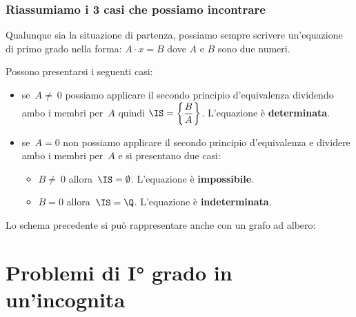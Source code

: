 \subsubsection{Riassumiamo i 3 casi che possiamo incontrare}

Qualunque sia la situazione di partenza, possiamo sempre scrivere un'equazione 
di primo grado nella forma: \quad 
\(A \cdot x = B\) \quad dove \(A\) e \(B\) sono due numeri.

Possono presentarsi i seguenti casi:
\begin{itemize} [nosep]
\item se~\(A\neq~0\) possiamo applicare il secondo principio
d'equivalenza dividendo ambo i membri per~\(A\) quindi
\(\IS =\left\{\dfrac{B}{A}\right\}\). L'equazione è \textbf{determinata}.
\item se~\(A=0\) non possiamo applicare il secondo principio
d'equivalenza e dividere ambo i membri per~\(A\) e si
presentano due casi:
\begin{itemize} [nosep]
\item \(B\neq~0\) allora~\(\IS =\emptyset \). 
L'equazione è \textbf{impossibile}.
\item \(B=0\) allora~\(\IS =\Q\). 
L'equazione è \textbf{indeterminata}.
\end{itemize}
\end{itemize}

Lo schema precedente si può rappresentare anche con un grafo ad albero:
{\alberoequazioni}





\section{Problemi di I° grado in un'incognita}
\label{sec:eq1_problemi}

